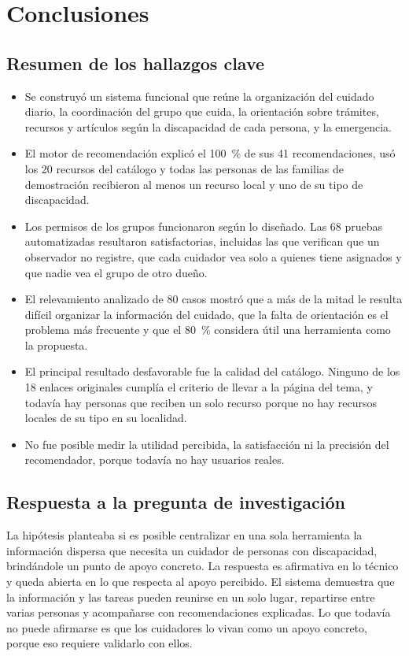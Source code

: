 \section{Conclusiones}

\subsection{Resumen de los hallazgos clave}

\begin{itemize}
    \item Se construyó un sistema funcional que reúne la organización del cuidado diario, la coordinación del grupo que cuida, la orientación sobre trámites, recursos y artículos según la discapacidad de cada persona, y la emergencia.
    \item El motor de recomendación explicó el 100~\% de sus 41 recomendaciones, usó los 20 recursos del catálogo y todas las personas de las familias de demostración recibieron al menos un recurso local y uno de su tipo de discapacidad.
    \item Los permisos de los grupos funcionaron según lo diseñado. Las 68 pruebas automatizadas resultaron satisfactorias, incluidas las que verifican que un observador no registre, que cada cuidador vea solo a quienes tiene asignados y que nadie vea el grupo de otro dueño.
    \item El relevamiento analizado de 80 casos mostró que a más de la mitad le resulta difícil organizar la información del cuidado, que la falta de orientación es el problema más frecuente y que el 80~\% considera útil una herramienta como la propuesta.
    \item El principal resultado desfavorable fue la calidad del catálogo. Ninguno de los 18 enlaces originales cumplía el criterio de llevar a la página del tema, y todavía hay personas que reciben un solo recurso porque no hay recursos locales de su tipo en su localidad.
    \item No fue posible medir la utilidad percibida, la satisfacción ni la precisión del recomendador, porque todavía no hay usuarios reales.
\end{itemize}

\subsection{Respuesta a la pregunta de investigación}

La hipótesis planteaba si es posible centralizar en una sola herramienta la información dispersa que necesita un cuidador de personas con discapacidad, brindándole un punto de apoyo concreto. La respuesta es afirmativa en lo técnico y queda abierta en lo que respecta al apoyo percibido. El sistema demuestra que la información y las tareas pueden reunirse en un solo lugar, repartirse entre varias personas y acompañarse con recomendaciones explicadas. Lo que todavía no puede afirmarse es que los cuidadores lo vivan como un apoyo concreto, porque eso requiere validarlo con ellos.

